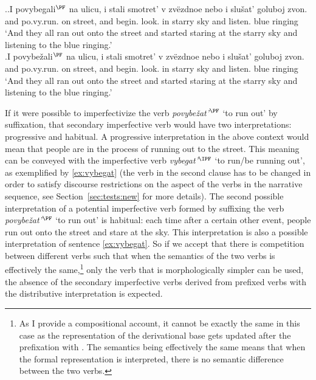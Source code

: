 \ex.\label{ex:povy}\ag.\label{ex:povybegat}I povybegali$^{\PF}$ na ulicu, i stali smotret' v zv\"{e}zdnoe nebo i slu\v{s}at' goluboj zvon.\\
and po.vy.run. on street, and begin. look. in starry sky and listen. blue ringing\\
\trans `And they all ran out onto the street and started staring at the starry sky and listening to the blue ringing.'\\
\bg.\label{ex:povybezhat}I povybe\v{z}ali$^{\PF}$ na ulicu, i stali smotret' v zv\"{e}zdnoe nebo i slu\v{s}at' goluboj zvon.\\
and po.vy.run. on street, and begin. look. in starry sky and listen. blue ringing\\
\trans `And they all ran out onto the street and started staring at the starry sky and listening to the blue ringing.'

If it were possible to imperfectivize the verb \textit{povybe\v{z}at'}$^{\PF}$ `to run out'  by suffixation, that secondary imperfective verb would have two interpretations: progressive and habitual. A progressive interpretation in the above context would mean that people are in the process of running out to the street. This meaning can be conveyed with the imperfective verb \textit{vybegat'}$^{\IPF}$ `to run/be running out', as exemplified by \ref{ex:vybegat} (the verb in the second clause has to be changed in order to satisfy discourse restrictions on the aspect of the verbs in the narrative sequence, see Section~\ref{sec:tests:new} for more details). The second possible interpretation of a potential imperfective verb formed by suffixing the verb \textit{povybe\v{z}at'}$^{\PF}$ `to run out' is habitual: each time after a certain other event, people run out onto the street and stare at the sky. This interpretation is also a possible interpretation of sentence \ref{ex:vybegat}. So if we accept that there is competition between different verbs such that when the semantics of the two verbs is effectively the same,\footnote{As I provide a compositional account, it cannot be exactly the same in this case as the representation of the derivational base gets updated after the prefixation with . The semantics being effectively the same means that when the formal representation is interpreted, there is no semantic difference between the two verbs.} only the verb that is morphologically simpler can be used, the absence of the secondary imperfective verbs derived from prefixed verbs with the distributive interpretation is expected.

